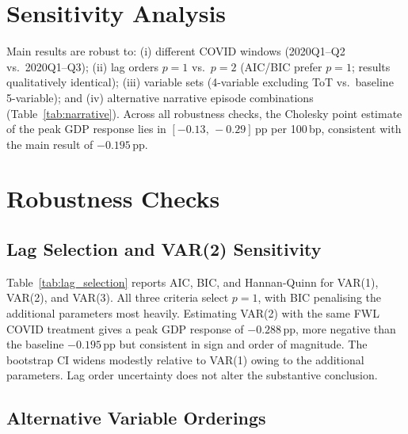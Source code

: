 \documentclass[12pt,letterpaper]{article}
\newenvironment{mytable}[2]{%
  \begin{table}[H]
  \centering
  \caption{#1}
  \label{#2}
  \begin{threeparttable}
}{%
  \end{threeparttable}
  \end{table}
}
\begin{document}
\section{Sensitivity Analysis}
\label{app:sensitivity}

Main results are robust to: (i) different COVID windows (2020Q1--Q2 vs.\
2020Q1--Q3); (ii) lag orders $p=1$ vs.\ $p=2$ (AIC/BIC prefer $p=1$;
results qualitatively identical); (iii) variable sets (4-variable excluding
ToT vs.\ baseline 5-variable); and (iv) alternative narrative episode
combinations (Table~\ref{tab:narrative}). Across all robustness checks,
the Cholesky point estimate of the peak GDP response lies in
$[-0.13,\,-0.29]$\,pp per 100\,bp, consistent with the main result of
$-0.195$\,pp.

\section{Robustness Checks}
\label{app:robustness}

\subsection{Lag Selection and VAR(2) Sensitivity}
\label{app:rob:lag}

Table~\ref{tab:lag_selection} reports AIC, BIC, and Hannan-Quinn for
VAR(1), VAR(2), and VAR(3). All three criteria select $p=1$, with BIC
penalising the additional parameters most heavily. Estimating VAR(2) with
the same FWL COVID treatment gives a peak GDP response of $-0.288$\,pp,
more negative than the baseline $-0.195$\,pp but consistent in sign and
order of magnitude. The bootstrap CI widens modestly relative to VAR(1)
owing to the additional parameters. Lag order uncertainty does not alter
the substantive conclusion.

\begin{mytable}{VAR Lag Selection: Information Criteria}{tab:lag_selection}
  
\end{mytable}

\subsection{Alternative Variable Orderings}
\label{app:rob:order}
\end{document}
